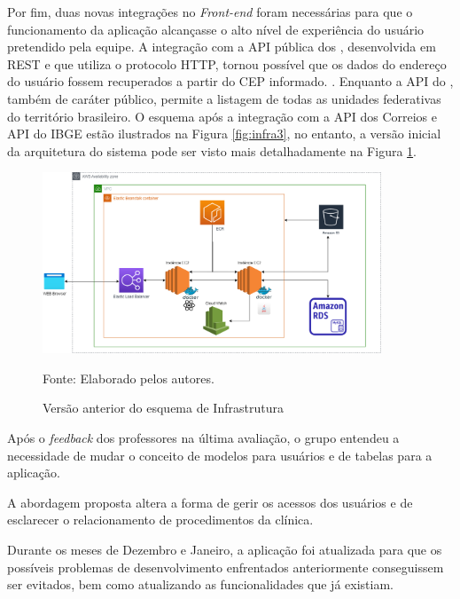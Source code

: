 \documentclass[
    12pt,               %
    openright,          %
    oneside,
    a4paper,            %
    BIBLATEX,           %
    TODO,               %
    english,            %
    brazil              %
    ]{ifsp-spo-inf-ctds}
\begin{document}
    Por fim, duas novas integrações no \emph{Front-end} foram necessárias para que o funcionamento da aplicação alcançasse o alto nível de experiência do usuário pretendido pela equipe. A integração com a API pública dos , desenvolvida em REST e que utiliza o protocolo HTTP, tornou possível que os dados do endereço do usuário fossem recuperados a partir do CEP informado. . Enquanto a API do , também de caráter público, permite a listagem de todas as unidades federativas do território brasileiro.
    O esquema após a integração com a API dos Correios e API do IBGE estão ilustrados na Figura \ref{fig:infra3}, no entanto, a versão inicial da arquitetura do sistema pode ser visto mais detalhadamente na Figura \ref{fig:infra}.

    \begin{figure}[H]
        	\centering
            \caption{Versão anterior do esquema de Infrastrutura}
            
        	\includegraphics[width=0.9\textwidth]{ArquiteturaAplicacao.png}
        	\label{fig:infra}
        	
        	\centering
            {\footnotesize Fonte: Elaborado pelos autores.}
   \end{figure}

    Após o \emph{feedback} dos professores na última avaliação, o grupo entendeu a necessidade de mudar o conceito de modelos para usuários e de tabelas para a aplicação.

    A abordagem proposta altera a forma de gerir os acessos dos usuários e de esclarecer o relacionamento de procedimentos da clínica.

    Durante os meses de Dezembro e Janeiro, a aplicação foi atualizada para que os possíveis problemas de desenvolvimento enfrentados anteriormente conseguissem ser evitados, bem como atualizando as funcionalidades que já existiam.
\end{document}
